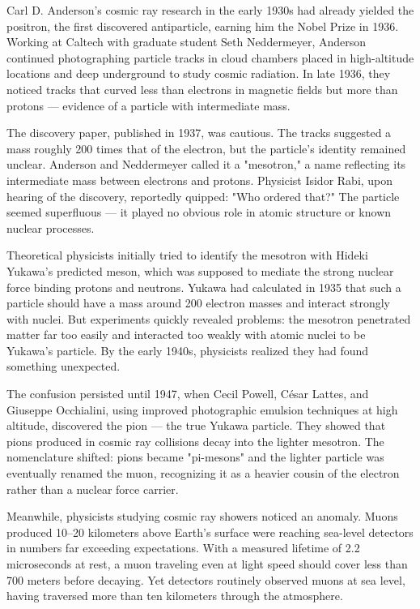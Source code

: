 \begin{historical}
Carl D. Anderson's cosmic ray research in the early 1930s had already yielded the positron, the first discovered antiparticle, earning him the Nobel Prize in 1936. Working at Caltech with graduate student Seth Neddermeyer, Anderson continued photographing particle tracks in cloud chambers placed in high-altitude locations and deep underground to study cosmic radiation. In late 1936, they noticed tracks that curved less than electrons in magnetic fields but more than protons — evidence of a particle with intermediate mass.

The discovery paper, published in 1937, was cautious. The tracks suggested a mass roughly 200 times that of the electron, but the particle's identity remained unclear. Anderson and Neddermeyer called it a "mesotron," a name reflecting its intermediate mass between electrons and protons. Physicist Isidor Rabi, upon hearing of the discovery, reportedly quipped: "Who ordered that?" The particle seemed superfluous — it played no obvious role in atomic structure or known nuclear processes.

Theoretical physicists initially tried to identify the mesotron with Hideki Yukawa's predicted meson, which was supposed to mediate the strong nuclear force binding protons and neutrons. Yukawa had calculated in 1935 that such a particle should have a mass around 200 electron masses and interact strongly with nuclei. But experiments quickly revealed problems: the mesotron penetrated matter far too easily and interacted too weakly with atomic nuclei to be Yukawa's particle. By the early 1940s, physicists realized they had found something unexpected.

The confusion persisted until 1947, when Cecil Powell, César Lattes, and Giuseppe Occhialini, using improved photographic emulsion techniques at high altitude, discovered the pion — the true Yukawa particle. They showed that pions produced in cosmic ray collisions decay into the lighter mesotron. The nomenclature shifted: pions became "pi-mesons" and the lighter particle was eventually renamed the muon, recognizing it as a heavier cousin of the electron rather than a nuclear force carrier.

Meanwhile, physicists studying cosmic ray showers noticed an anomaly. Muons produced 10–20 kilometers above Earth's surface were reaching sea-level detectors in numbers far exceeding expectations. With a measured lifetime of 2.2 microseconds at rest, a muon traveling even at light speed should cover less than 700 meters before decaying. Yet detectors routinely observed muons at sea level, having traversed more than ten kilometers through the atmosphere.


\end{historical}
